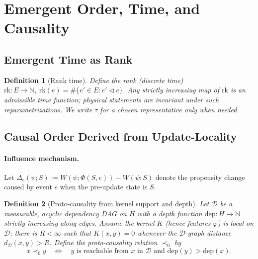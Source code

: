 \documentclass[12pt,a4paper]{article}
\newtheorem{definition}{Definition}
\newcommand{\N}{\mathbb{N}}
\newcommand{\rk}{\mathrm{rk}}
\begin{document}



\section{Emergent Order, Time, and Causality}

\subsection{Emergent Time as Rank}

\begin{definition}[Rank time]
Define the rank (discrete time)
$\rk:E\to\N,\ \rk(e)=\#\{e'\in E: e'\triangleleft e\}$.
Any strictly increasing map of $\rk$ is an admissible time function; physical statements are invariant under such reparametrizations.
We write $\tau$ for a chosen representative only when needed.
\end{definition}

\subsection{Causal Order Derived from Update-Locality}

\paragraph{Influence mechanism.}
Let $\Delta_e(\psi;S):=W(\psi;\Phi(S,e))-W(\psi;S)$ denote the propensity change caused by event $e$ when the pre-update state is $S$.

\begin{definition}[Proto-causality from kernel support and depth]\label{def:proto}
Let $\mathcal{D}$ be a measurable, acyclic dependency DAG on $H$ with a depth function $\mathrm{dep}:H\to\mathbb{N}$ strictly increasing along edges.
Assume the kernel $K$ (hence features $\varphi$) is \emph{local on $\mathcal{D}$}: there is $R<\infty$ such that $K(x,y)=0$ whenever the $\mathcal{D}$-graph distance $d_\mathcal{D}(x,y)>R$.
Define the proto-causality relation $\prec_0$ by
\[
x\prec_0 y \quad\Longleftrightarrow\quad \text{$y$ is reachable from $x$ in $\mathcal{D}$ and $\mathrm{dep}(y)>\mathrm{dep}(x)$}.
\]
\end{definition}
\end{document}
